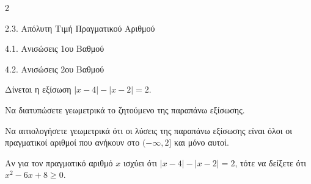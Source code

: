 \begin{ylh}{2}
    \item 2.3. Απόλυτη Τιμή Πραγματικού Αριθμού
    \item 4.1. Ανισώσεις 1ου Βαθμού
    \item 4.2. Ανισώσεις 2ου Βαθμού
\end{ylh}
Δίνεται η εξίσωση $|x - 4| - |x - 2| = 2$.
\begin{alist}
\item Να διατυπώσετε γεωμετρικά το ζητούμενο της παραπάνω εξίσωσης. 
\item Να αιτιολογήσετε γεωμετρικά ότι οι λύσεις της παραπάνω εξίσωσης είναι όλοι οι πραγματικοί αριθμοί που ανήκουν στο $(-\infty, 2]$ και μόνο αυτοί.
\item Αν για τον πραγματικό αριθμό $x$ ισχύει ότι $|x - 4| - |x - 2| = 2$, τότε να δείξετε ότι $x^2 - 6x + 8 \ge 0$.

\end{alist}

